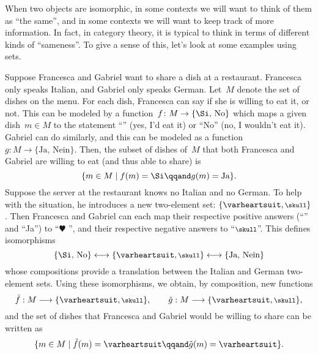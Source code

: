 When two objects are isomorphic, in some contexts we will want to think of them as ``the same'', and in some contexts we will want to keep track of more information.
In fact, in category theory, it is typical to think in terms of different kinds of ``sameness''.
To give a sense of this, let's look at some examples using sets.

\begin{example}
    Suppose Francesca and Gabriel want to share a dish at a restaurant.
    Francesca only speaks Italian, and Gabriel only speaks German.
    Let~$M$ denote the set of dishes on the menu.
    For each dish, Francesca can say if she is willing to eat it, or not.
    This can be modeled by a function~$f\colon M \to \{ \text{\Si, No} \}$ which maps a given dish~$m \in M$ to the statement ``\Si'' (yes, I'd eat it) or ``No'' (no, I wouldn't eat it).
    Gabriel can do similarly, and this can be modeled as a function~$g\colon M \to \{ \text{Ja, Nein} \}$.
    Then, the subset of dishes of~$M$ that both Francesca and Gabriel are willing to eat (and thus able to share) is
    \begin{equation*}
        \{ m \in M \mid f(m) = \text{\Si}  \qqand  g(m) = \text{Ja} \}.
    \end{equation*}
    Suppose the server at the restaurant knows no Italian and no German.
    To help with the situation, he introduces a new two-element set: $\{ \varheartsuit, \mbox{\footnotesize $\skull$} \}$.
    Then Francesca and Gabriel can each map their respective positive answers (``\Si'' and ``Ja'') to ``$\varheartsuit$ '', and their respective negative answers to ``$\mbox{\footnotesize $\skull$}$''.
    This defines isomorphisms
    \begin{equation*}
        \{ \text{\Si, No} \} \longleftrightarrow \{ \varheartsuit, \mbox{\footnotesize $\skull$} \} \longleftrightarrow \{ \text{Ja, Nein} \}
    \end{equation*}
    whose compositions provide a translation between the Italian and German two-element sets.
    Using these isomorphisms, we obtain, by composition, new functions
    \begin{equation*}
        \tilde f: M \longrightarrow \{ \varheartsuit, \mbox{\footnotesize $\skull$} \}, \qquad \tilde g: M \longrightarrow \{ \varheartsuit, \mbox{\footnotesize $\skull$} \},
    \end{equation*}
    and the set of dishes that Francesca and Gabriel would be willing to share can be written as
    \begin{equation*}
        \{ m \in M \mid \tilde f(m) = \varheartsuit \qqand \tilde g(m) = \varheartsuit \}.
    \end{equation*}


\end{example}
